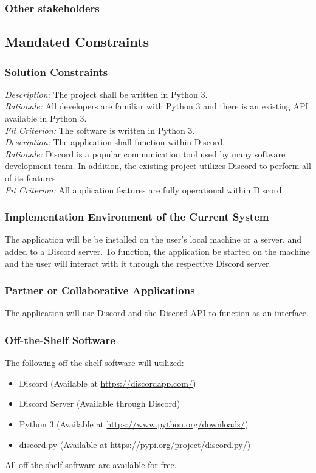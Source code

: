 \documentclass[12pt, titlepage]{article}
\begin{document}
\subsubsection{Other stakeholders}


\subsection{Mandated Constraints}
\subsubsection{Solution Constraints}
\noindent \textit{Description:} The project shall be written in Python 3.\\
\textit{Rationale:} All developers are familiar with Python 3 and there is an existing API available in Python 3.\\
\textit{Fit Criterion:} The software is written in Python 3.\\

\noindent \textit{Description:} The application shall function within Discord.\\
\textit{Rationale:} Discord is a popular communication tool used by many software development team. In addition, the existing project utilizes Discord to perform all of its features.\\
\textit{Fit Criterion:} All application features are fully operational within Discord.

\subsubsection{Implementation Environment of the Current System}
The application will be be installed on the user's local machine or a server, and added to a Discord server. To function, the application be started on the machine and the user will interact with it through the respective Discord server.

\subsubsection{Partner or Collaborative Applications}
The application will use Discord and the Discord API to function as an interface.

\subsubsection{Off-the-Shelf Software}
The following off-the-shelf software will utilized:
\begin{itemize}
    \item Discord (Available at \url{https://discordapp.com/})
    \item Discord Server (Available through Discord)
    \item Python 3 (Available at \url{https://www.python.org/downloads/})
    \item discord.py (Available at \url{https://pypi.org/project/discord.py/})
\end{itemize}
All off-the-shelf software are available for free.
\end{document}
